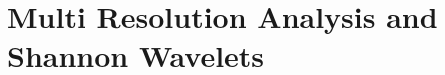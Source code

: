 \documentclass[12,twoside]{mammeTFM}
\newtheorem{lem}[thm]{Lemma}
\theoremstyle{definition}
\theoremstyle{remark}
\begin{document}






\section{Multi Resolution Analysis and Shannon Wavelets}
\end{document}
